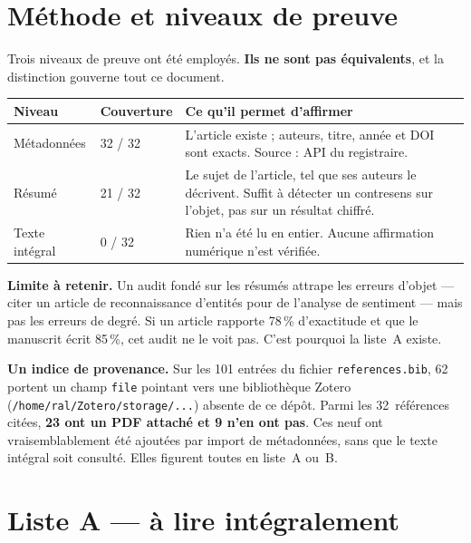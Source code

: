 \documentclass[11pt,a4paper]{article}
\newcommand{\cle}[1]{\texttt{\small #1}}
\begin{document}
\section{Méthode et niveaux de preuve}

Trois niveaux de preuve ont été employés. \textbf{Ils ne sont pas
équivalents}, et la distinction gouverne tout ce document.

\begin{center}
\begin{tabular}{@{}llp{9.4cm}@{}}
\toprule
\textbf{Niveau} & \textbf{Couverture} & \textbf{Ce qu'il permet d'affirmer} \\
\midrule
Métadonnées & 32 / 32 &
L'article existe ; auteurs, titre, année et DOI sont exacts. Source :
API du registraire. \\[1.5mm]
Résumé & 21 / 32 &
Le sujet de l'article, tel que ses auteurs le décrivent. Suffit à détecter
un contresens sur l'objet, pas sur un résultat chiffré. \\[1.5mm]
Texte intégral & 0 / 32 &
Rien n'a été lu en entier. Aucune affirmation numérique n'est vérifiée. \\
\bottomrule
\end{tabular}
\end{center}

\vspace{2mm}
\noindent\textbf{Limite à retenir.} Un audit fondé sur les résumés attrape les
erreurs d'objet --- citer un article de reconnaissance d'entités pour de
l'analyse de sentiment --- mais pas les erreurs de degré. Si un article rapporte
78\,\% d'exactitude et que le manuscrit écrit 85\,\%, cet audit ne le voit pas.
C'est pourquoi la liste~A existe.

\medskip
\noindent\textbf{Un indice de provenance.} Sur les 101 entrées du fichier
\cle{references.bib}, 62 portent un champ \cle{file} pointant vers une
bibliothèque Zotero (\cle{/home/ral/Zotero/storage/...}) absente de ce dépôt.
Parmi les 32~références citées, \textbf{23 ont un PDF attaché et 9 n'en ont
pas}. Ces neuf ont vraisemblablement été ajoutées par import de métadonnées,
sans que le texte intégral soit consulté. Elles figurent toutes en liste~A ou~B.

\section{Liste A --- à lire intégralement}
\label{sec:A}
\end{document}

